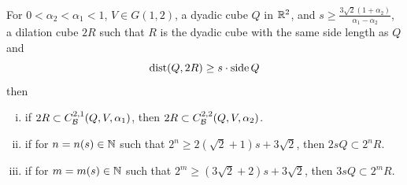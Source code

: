 \begin{lemma}\label{lemma:s-guarantee-containQ-between-2alpha}
    For $0<\alpha_2<\alpha_1<1$, $V\in G(1, 2)$, a dyadic cube $Q$ in $\mathbb{R}^2$, and $s\geq \frac{3\sqrt{2}(1+\alpha_2)}{\alpha_1-\alpha_2}$, a dilation cube $2R$ such that $R$ is the dyadic cube with the same side length as $Q$ and
    \begin{equation*}
        \operatorname{dist}(Q, 2R)\geq s\cdot \operatorname{side} Q
    \end{equation*}
    then
    \begin{enumerate}[(i)]
        \item \label{lemma-1:s-guarantee-containQ-between-2alpha} {\color{red} if $2R\subset C_\mathcal B^{2,1}(Q, V, \alpha_1)$, then $2R\subset  C_\mathcal B^{2,2}(Q, V, \alpha_2)$.}
        \item \label{lemma-2:s-guarantee-containQ-between-2alpha} if for $n = n(s) \in \mathbb{N}$ such that $2^n\geq 2(\sqrt{2}+1)s + 3\sqrt{2}$, then $2sQ\subset 2^n R $.
        \item \label{lemma-3:s-guarantee-containQ-between-2alpha} if for $m = m(s) \in \mathbb{N}$ such that $2^m \geq (3\sqrt{2}+2)s + 3\sqrt{2}$, then $3sQ\subset 2^m R$. 
    \end{enumerate}
\end{lemma}
